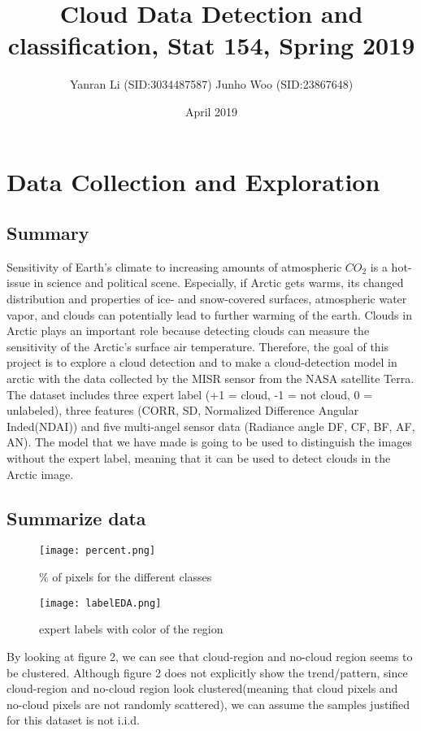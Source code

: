 \documentclass[12pt]{extarticle}
\title{Cloud Data Detection and classification, Stat 154, Spring 2019}
\author{Yanran Li (SID:3034487587)  Junho Woo (SID:23867648)}
\date{April 2019}
\begin{document}
\maketitle

\section{Data Collection and Exploration}
\subsection{Summary}

Sensitivity of Earth’s climate to increasing amounts of atmospheric $CO_2$ is a hot-issue in science and political scene. Especially, if Arctic gets warms, its changed distribution and properties of ice- and snow-covered surfaces, atmospheric water vapor, and clouds can potentially lead to further warming of the earth. Clouds in Arctic plays an important role because detecting clouds can measure the sensitivity of the Arctic’s surface air temperature. Therefore, the goal of this project is to explore a cloud detection and to make a cloud-detection model in arctic with the data collected by the MISR sensor from the NASA satellite Terra. The dataset includes three expert label (+1 = cloud, -1 = not cloud, 0 = unlabeled), three features (CORR, SD, Normalized Difference Angular Inded(NDAI)) and five multi-angel sensor data (Radiance angle DF, CF, BF, AF, AN). The model that we have made is going to be used to distinguish the images without the expert label, meaning that it can be used to detect clouds in the Arctic image\cite{yu2008}.  
 
\subsection{Summarize data}

\begin{figure}[htb]
	\centering
	\texttt{[image: percent.png]}
	\caption{$\%$ of pixels for the different classes}\label{fig 1}
\end{figure}

\begin{figure}[htb]
	\centering
	\texttt{[image: labelEDA.png]}
	\caption{expert labels with color of the region}\label{fig 2}
\end{figure}

By looking at  figure 2, we can see that cloud-region and no-cloud region seems to be clustered. Although figure 2 does not explicitly show the trend/pattern, since cloud-region and no-cloud region look clustered(meaning that cloud pixels and no-cloud pixels are not randomly scattered), we can assume the samples justified for this dataset is not i.i.d.
\end{document}
